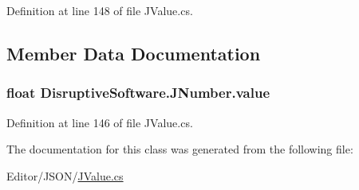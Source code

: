 Definition at line 148 of file J\+Value.\+cs.



\subsection{Member Data Documentation}
\hypertarget{class_disruptive_software_1_1_j_number_adc93aa05ded6a53e3788cb8176dc70d7}{
\subsubsection[{value}]{\setlength{\rightskip}{0pt plus 5cm}float Disruptive\+Software.\+J\+Number.\+value}}\label{class_disruptive_software_1_1_j_number_adc93aa05ded6a53e3788cb8176dc70d7}


Definition at line 146 of file J\+Value.\+cs.



The documentation for this class was generated from the following file\+:\begin{DoxyCompactItemize}
\item 
Editor/\+J\+S\+O\+N/\hyperlink{_j_value_8cs}{J\+Value.\+cs}\end{DoxyCompactItemize}
